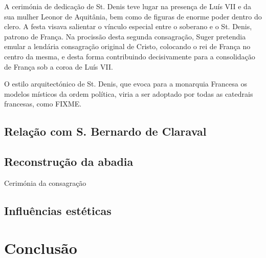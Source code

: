 \documentclass{article}
\begin{document}
A cerimónia de dedicação de St. Denis teve lugar na presença de Luís
VII e da sua mulher Leonor de Aquitânia, bem como de figuras de enorme
poder dentro do clero. A festa visava salientar o vínculo especial
entre o soberano e o St. Denis, patrono de França. Na procissão desta
segunda consagração, Suger pretendia emular a lendária consagração
original de Cristo, colocando o rei de França no centro da mesma, e
desta forma contribuindo decisivamente para a consolidação de França
sob a coroa de Luís VII.

O estilo arquitectónico de St. Denis, que evoca para a monarquia
Francesa os modelos místicos da ordem política, viria a ser adoptado
por todas as catedrais francesas, como FIXME.
















\subsection{Relação com S. Bernardo de Claraval}

\subsection{Reconstrução da abadia}


Cerimónia da consagração

\subsection{Influências estéticas}

\section{Conclusão}

\printbibliography[heading=bibliography,title={Bibliografia},type=book]
\end{document}
